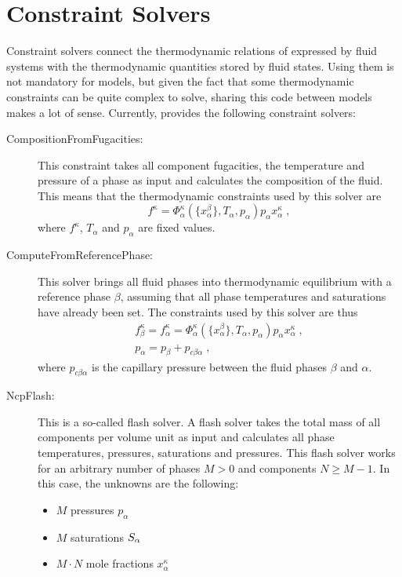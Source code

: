\section{Constraint Solvers}
\label{sec:constraint_solvers}

Constraint solvers connect the thermodynamic relations of expressed by
fluid systems with the thermodynamic quantities stored by fluid
states. Using them is not mandatory for models, but given the fact
that some thermodynamic constraints can be quite complex to solve,
sharing this code between models makes a lot of sense. Currently,
\Dumux provides the following constraint solvers:
\begin{description}
\item[CompositionFromFugacities:] This constraint takes all
  component fugacities, the temperature and pressure of a phase as
  input and calculates the composition of the fluid. This means that
  the thermodynamic constraints used by this solver are
  \[
  f^\kappa = \Phi^\kappa_\alpha(\{x^\beta_\alpha \}, T_\alpha, p_\alpha)  p_\alpha x^\kappa_\alpha\;,
  \]
  where ${f^\kappa}$, $T_\alpha$ and $p_\alpha$ are fixed values.
\item[ComputeFromReferencePhase:] This solver brings all
  fluid phases into thermodynamic equilibrium with a reference phase
  $\beta$, assuming that all phase temperatures and saturations have
  already been set. The constraints used by this solver are thus
  \begin{eqnarray*}
  f^\kappa_\beta = f^\kappa_\alpha = \Phi^\kappa_\alpha(\{x^\beta_\alpha \}, T_\alpha, p_\alpha)  p_\alpha x^\kappa_\alpha\;, \\
  p_\alpha = p_\beta + p_{c\beta\alpha} \;,
  \end{eqnarray*}
  where $p_{c\beta\alpha}$ is the capillary pressure between the
  fluid phases $\beta$ and $\alpha$.
\item[NcpFlash:] This is a so-called flash solver. A flash
  solver takes the total mass of all components per volume unit as
  input and calculates all phase temperatures, pressures, saturations
  and pressures. This flash solver works for an arbitrary number of
  phases $M > 0$ and components $N \geq M - 1$. In this case,
  the unknowns are the following:
  \begin{itemize}
  \item $M$ pressures $p_\alpha$
  \item $M$ saturations $S_\alpha$
  \item $M\cdot N$ mole fractions $x^\kappa_\alpha$

\end{itemize}
\end{description}
